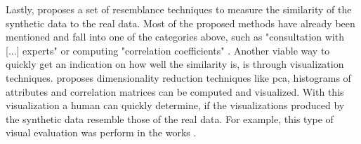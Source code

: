 Lastly, \cite{hernandez2022SyntheticDataGeneration} proposes a set of resemblance techniques to measure the similarity of the synthetic data to the real data.
Most of the proposed methods have already been mentioned and fall into one of the categories above, such as "consultation with [...] experts" or computing "correlation coefficients" \cite{hernandez2022SyntheticDataGeneration}.
Another viable way to quickly get an indication on how well the similarity is, is through visualization techniques.
\cite{hernandez2022SyntheticDataGeneration} proposes dimensionality reduction techniques like \gls{pca}, histograms of attributes and correlation matrices can be computed and visualized.
With this visualization a human can quickly determine, if the visualizations produced by the synthetic data resemble those of the real data.
For example, this type of visual evaluation was perform in the works \cite{li2022TTSGANTransformerbasedTimeSeries, leminh2021AirGenGANbasedSynthetica, mckeever2020SynthesisingTabularDatasets}.


